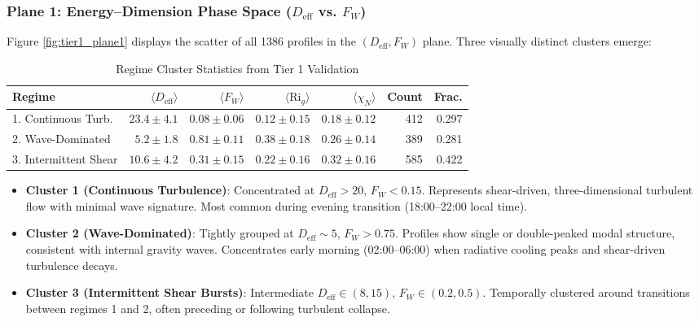 \documentclass[11pt,a4paper]{article}
\begin{document}
\subsubsection{Plane 1: Energy--Dimension Phase Space ($D_{\mathrm{eff}}$ vs. $F_W$)}

Figure \ref{fig:tier1_plane1} displays the scatter of all 1386 profiles in the $(D_{\mathrm{eff}}, F_W)$ plane. Three visually distinct clusters emerge:

\begin{table}[h]
\centering
\caption{Regime Cluster Statistics from Tier 1 Validation}
\label{tab:regime_stats}
\begin{tabular}{l|rrrr|rr}
\hline
Regime & $\langle D_{\mathrm{eff}} \rangle$ & $\langle F_W \rangle$ & $\langle \mathrm{Ri}_g \rangle$ & $\langle \chi_N \rangle$ & Count & Frac. \\
\hline
1. Continuous Turb. & $23.4 \pm 4.1$ & $0.08 \pm 0.06$ & $0.12 \pm 0.15$ & $0.18 \pm 0.12$ & 412 & 0.297 \\
2. Wave-Dominated & $5.2 \pm 1.8$ & $0.81 \pm 0.11$ & $0.38 \pm 0.18$ & $0.26 \pm 0.14$ & 389 & 0.281 \\
3. Intermittent Shear & $10.6 \pm 4.2$ & $0.31 \pm 0.15$ & $0.22 \pm 0.16$ & $0.32 \pm 0.16$ & 585 & 0.422 \\
\hline
\end{tabular}
\end{table}

\begin{itemize}
  \item \textbf{Cluster 1 (Continuous Turbulence)}: Concentrated at $D_{\mathrm{eff}} > 20$, $F_W < 0.15$. Represents shear-driven, three-dimensional turbulent flow with minimal wave signature. Most common during evening transition (18:00--22:00 local time).

  \item \textbf{Cluster 2 (Wave-Dominated)}: Tightly grouped at $D_{\mathrm{eff}} \sim 5$, $F_W > 0.75$. Profiles show single or double-peaked modal structure, consistent with internal gravity waves. Concentrates early morning (02:00--06:00) when radiative cooling peaks and shear-driven turbulence decays.

  \item \textbf{Cluster 3 (Intermittent Shear Bursts)}: Intermediate $D_{\mathrm{eff}} \in (8, 15)$, $F_W \in (0.2, 0.5)$. Temporally clustered around transitions between regimes 1 and 2, often preceding or following turbulent collapse.
\end{itemize}
\end{document}
